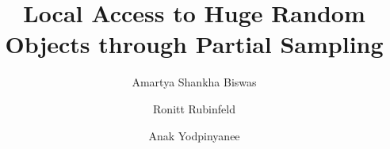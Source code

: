 \documentclass[a4paper,UKenglish,cleveref,autoref]{lipics-v2019}
\title{Local Access to Huge Random Objects through Partial Sampling}
\date{}
\author{Amartya Shankha Biswas}{CSAIL, MIT}{asbiswas@mit.edu}{https://orcid.org/0000-0002-5068-1524}{funding}
\author{Ronitt Rubinfeld}{CSAIL, MIT}{ronitt@csail.mit.edu}{}{funding}
\author{Anak Yodpinyanee}{CSAIL, MIT}{anak@csail.mit.edu}{https://orcid.org/0000-0002-7572-2003}{funding}
\theoremstyle{plain}
\begin{document}
\maketitle


\begingroup
  \tableofcontents
\endgroup
\newpage






%
%

%







\end{document}
